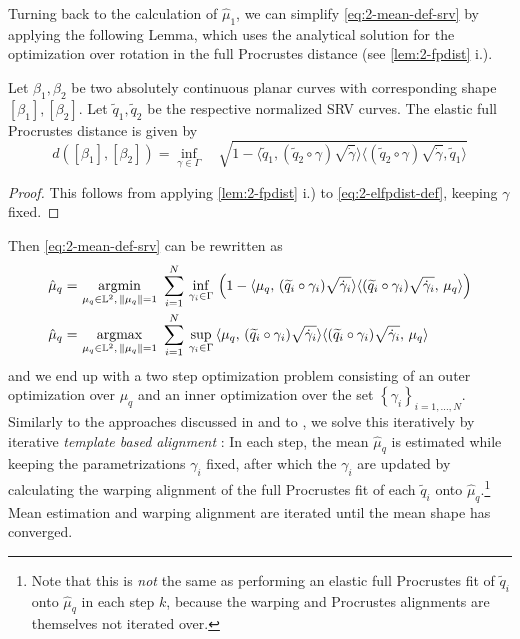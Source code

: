 Turning back to the calculation of $\hat\mu_1$, we can simplify \cref{eq:2-mean-def-srv} by applying the following Lemma, which uses the analytical solution for the optimization over rotation in the full Procrustes distance (see \cref{lem:2-fpdist} i.). 

\begin{lemma}
  \label{lem:2-elfpdist}
  Let $\beta_1, \beta_2$ be two absolutely continuous planar curves with corresponding shape $[\beta_1], [\beta_2]$. Let $\widetilde q_1, \widetilde q_2$ be the respective normalized SRV curves.
  The elastic full Procrustes distance is given by
  \begin{equation}
    d([\beta_1],[\beta_2]) = \inf_{\gamma \in \Gamma} \quad \sqrt{ 1 - \langle \widetilde q_1, ( \widetilde q_2 \circ \gamma) \sqrt{\dot\gamma} \rangle \langle (\widetilde q_2 \circ \gamma) \sqrt{\dot\gamma}, \widetilde q_1 \rangle }
  \end{equation}
  \begin{proof}
    This follows from applying \cref{lem:2-fpdist} i.) to \cref{eq:2-elfpdist-def}, keeping $\gamma$ fixed.
  \end{proof}
\end{lemma}

\noindent Then \cref{eq:2-mean-def-srv} can be rewritten as
\begin{align}
  \hat\mu_q = &\, \operatorname*{argmin}_{\mu_q \in \mathbb{L}^2,\,\lVert\mu_q\rVert = 1}\,\,
    \sum_{i=1}^N \,\inf_{\gamma_i \in \Gamma}\, \left(1 - \langle \mu_q,\,(\widetilde q_i \circ \gamma_i) \sqrt{\dot\gamma_i} \rangle \langle (\widetilde q_i \circ \gamma_i) \sqrt{\dot\gamma_i},\, \mu_q\rangle \right) \\
  \hat\mu_q = &\, \operatorname*{argmax}_{\mu_q \in \mathbb{L}^2,\,\lVert\mu_q\rVert = 1}\,\,
    \sum_{i=1}^N \,\sup_{\gamma_i \in \Gamma}\, \langle \mu_q,\,(\widetilde q_i \circ \gamma_i) \sqrt{\dot\gamma_i} \rangle \langle (\widetilde q_i \circ \gamma_i) \sqrt{\dot\gamma_i},\, \mu_q\rangle\,
\end{align}
and we end up with a two step optimization problem consisting of an outer optimization over $\mu_q$ and an inner optimization over the set $\left\{\gamma_i\right\}_{i=1,\dots,N}$.
Similarly to the approaches discussed in \cite{SrivastavaKlassen2016} and to \cite{Steyer2021}, we solve this iteratively by iterative \emph{template based alignment} \parencite[see e.g.][271]{SrivastavaKlassen2016}:
In each step, the mean $\hat\mu_q$ is estimated while keeping the parametrizations $\gamma_i$ fixed, after which the $\gamma_i$ are updated by calculating the warping alignment of the full Procrustes fit of each $\widetilde q_i$ onto $\hat\mu_q$.\footnote{Note that this is \emph{not} the same as performing an elastic full Procrustes fit of $\widetilde q_i$ onto $\hat \mu_q$ in each step $k$, because the warping and Procrustes alignments are themselves not iterated over.}
Mean estimation and warping alignment are iterated until the mean shape has converged.

